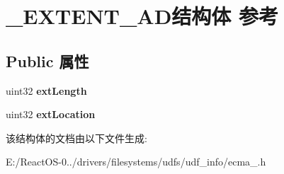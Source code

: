 \hypertarget{struct___e_x_t_e_n_t___a_d}{}\section{\+\_\+\+E\+X\+T\+E\+N\+T\+\_\+\+A\+D结构体 参考}
\label{struct___e_x_t_e_n_t___a_d}
\subsection*{Public 属性}
\begin{DoxyCompactItemize}
\item 
\mbox{\label{struct___e_x_t_e_n_t___a_d_ab1197738427d23b561163eb3d7184f44}} 
uint32 {\bfseries ext\+Length}
\item 
\mbox{\label{struct___e_x_t_e_n_t___a_d_ae9f286ea8963ea6a94aa665ba27a319a}} 
uint32 {\bfseries ext\+Location}
\end{DoxyCompactItemize}


该结构体的文档由以下文件生成\+:\begin{DoxyCompactItemize}
\item 
E\+:/\+React\+O\+S-\/0../drivers/filesystems/udfs/udf\+\_\+info/ecma\+\_.\+h\end{DoxyCompactItemize}
